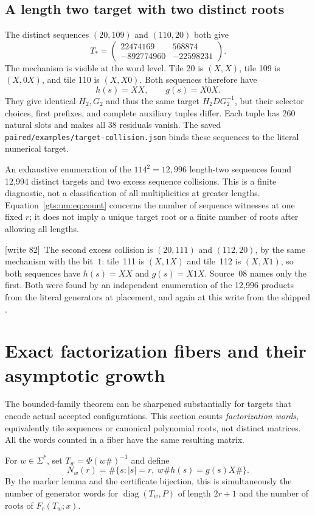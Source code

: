 \documentclass[11pt,letterpaper]{article}
\theoremstyle{definition}
\theoremstyle{remark}
\newcommand{\smallmat}[4]{\begin{pmatrix}#1&#2\\#3&#4\end{pmatrix}}
\newcommand{\diag}{\operatorname{diag}}
\newcommand{\code}[1]{\nolinkurl{#1}}
\newcommand{\wtagc}{\textup{[write 82]}}
\begin{document}
\subsection{A length two target with two distinct roots}
The distinct sequences $(20,109)$ and $(110,20)$ both give
\begin{equation}\label{gts:um:eq:collision}
 T_*=
 \smallmat{22474169}{568874}{-892774960}{-22598231}.
\end{equation}
The mechanism is visible at the word level. Tile 20 is $(X,X)$, tile 109 is $(X,0X)$, and tile 110 is $(X,X0)$. Both sequences therefore have
\[
 h(s)=XX,\qquad g(s)=X0X.
\]
They give identical $H_2,G_2$ and thus the same target $H_2DG_2^{-1}$, but their selector choices, first prefixes, and complete auxiliary tuples differ. Each tuple has 260 natural slots and makes all 38 residuals vanish. The saved \code{paired/examples/target-collision.json} binds these sequences to the literal numerical target.

An exhaustive enumeration of the $114^2=12{,}996$ length-two sequences found 12,994 distinct targets and two excess sequence collisions. This is a finite diagnostic, not a classification of all multiplicities at greater lengths. Equation~\eqref{gts:um:eq:count} concerns the number of sequence witnesses at one fixed $r$; it does not imply a unique target root or a finite number of roots after allowing all lengths.

\wtagc\ The second excess collision is $(20,111)$ and $(112,20)$, by the same mechanism with the bit~$1$: tile~111 is $(X,1X)$ and tile~112 is $(X,X1)$, so both sequences have $h(s)=XX$ and $g(s)=X1X$. Source~08 names only the first. Both were found by an independent enumeration of the 12,996 products from the literal generators at placement, and again at this write from the shipped .

\section{Exact factorization fibers and their asymptotic growth}
\label{gts:um:sec:fibers}
The bounded-family theorem can be sharpened substantially for targets that encode actual accepted configurations. This section counts \emph{factorization words}, equivalently tile sequences or canonical polynomial roots, not distinct matrices. All the words counted in a fiber have the same resulting matrix.

For $w\in\Sigma^*$, set $T_w=\Phi(w\#)^{-1}$ and define
\[
 N_w(r)=\#\{s:|s|=r,\ w\#h(s)=g(s)X\#\}.
\]
By the marker lemma and the certificate bijection, this is simultaneously the number of generator words for $\diag(T_w,P)$ of length $2r+1$ and the number of roots of $F_r(T_w;x)$.
\end{document}
